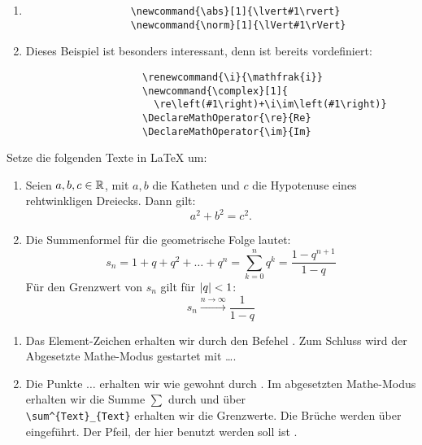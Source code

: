 \begin{uebung}
\begin{loesung}
\begin{enumerate}[label=(\alph*)]
\begin{verbatim}
            \end{pmatrix}}
            \end{verbatim}
            \item \begin{verbatim}
                  \newcommand{\abs}[1]{\lvert#1\rvert}
                  \newcommand{\norm}[1]{\lVert#1\rVert}
                  \end{verbatim}
            \item Dieses Beispiel ist besonders interessant, denn  ist bereits vordefiniert: \\
                    \begin{verbatim}
                    \renewcommand{\i}{\mathfrak{i}}
                    \newcommand{\complex}[1]{
                      \re\left(#1\right)+\i\im\left(#1\right)}
                    \DeclareMathOperator{\re}{Re}
                    \DeclareMathOperator{\im}{Im}
                    \end{verbatim}
            \end{enumerate}
        \end{loesung}
\item Setze die folgenden Texte in \LaTeX{} um:
        \begin{enumerate}[label=(\alph*)]
         \item Seien $a,b,c\in\mathbb{R}$, mit $a,b$ die Katheten und $c$ die Hypotenuse eines rehtwinkligen Dreiecks. Dann gilt: 
                \[
                    a^2+b^2=c^2.
                \]
          \item Die Summenformel für die geometrische Folge lautet:
          \[
              s_n = 1+ q+q^2+\dots+q^n = \sum_{k=0}^{n}q^k = \frac{1-q^{n+1}}{1-q}
          \]
          Für den Grenzwert von $s_n$ gilt für $\abs{q}<1$: 
          \[
              s_n\xrightarrow{n\rightarrow\infty} \frac{1}{1-q}
          \]
          
        \end{enumerate}
        \begin{loesung}
            \begin{enumerate}
                \item Das Element-Zeichen erhalten wir durch den Befehel . Zum Schluss wird der Abgesetzte Mathe-Modus gestartet mit \cmd{[} \dots \cmd{]}. 
                \item Die Punkte $\dots$ erhalten wir wie gewohnt durch . Im abgesetzten Mathe-Modus erhalten wir die Summe $\sum$ durch  und über \\ \verb|\sum^{Text}_{Text}| erhalten wir die Grenzwerte. Die Brüche werden über  eingeführt. Der Pfeil, der hier benutzt werden soll ist .
            \end{enumerate}
        \end{loesung}
\end{uebung}